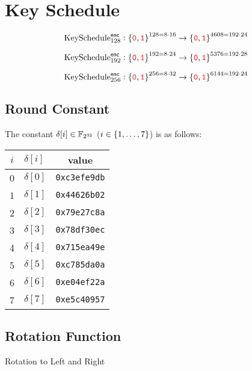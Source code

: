 \section{Key Schedule}

$$
\text{KeySchedule}^{\mathsf{enc}}_{128}:\set{\textcolor{red}{\texttt{0}},\textcolor{red}{\texttt{1}}}^{128=8\cdot 16}\to\set{\textcolor{red}{\texttt{0}},\textcolor{red}{\texttt{1}}}^{4608=192\cdot 24}
$$

$$
\text{KeySchedule}^{\mathsf{enc}}_{192}:\set{\textcolor{red}{\texttt{0}},\textcolor{red}{\texttt{1}}}^{192=8\cdot 24}\to\set{\textcolor{red}{\texttt{0}},\textcolor{red}{\texttt{1}}}^{5376=192\cdot 28}
$$

$$
\text{KeySchedule}^{\mathsf{enc}}_{256}:\set{\textcolor{red}{\texttt{0}},\textcolor{red}{\texttt{1}}}^{256=8\cdot 32}\to\set{\textcolor{red}{\texttt{0}},\textcolor{red}{\texttt{1}}}^{6144=192\cdot 24}
$$

\subsection{Round Constant}
The constant $\delta[i]\in\mathbb{F}_{2^{32}}$ ($i\in\set{1,\dots,7}$) is as follows:
\begin{table}[h!]\centering\renewcommand{\arraystretch}{1.25} %
	\begin{tabular}{c|lc}
		$i$ & $\delta[i]$ & value\\
		\midrule
		0 & $\delta[0]$ & \texttt{0xc3efe9db}\\
		1 & $\delta[1]$ & \texttt{0x44626b02}\\
		2 & $\delta[2]$ & \texttt{0x79e27c8a}\\
		3 & $\delta[3]$ & \texttt{0x78df30ec}\\
		4 & $\delta[4]$ & \texttt{0x715ea49e}\\
		5 & $\delta[5]$ & \texttt{0xc785da0a}\\
		6 & $\delta[6]$ & \texttt{0xe04ef22a}\\
		7 & $\delta[7]$ & \texttt{0xe5c40957}
	\end{tabular}
\end{table}

\subsection{Rotation Function}

\begin{algorithm}[H]
	\caption{Rotation to Left and Right}
	\BlankLine
\end{algorithm}

